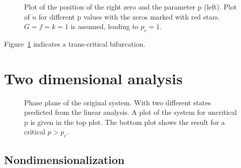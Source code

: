 \begin{figure}

\caption{Plot of the position of the right zero and the parameter p (left). Plot of $\dot{n}$ for different p values with the zeros marked with red stars. $G=f=k=1$ is assumed, leading to $p_c = 1$.}
\label{fig:transBif}
\end{figure}
Figure~\ref{fig:transBif} indicates a trans-critical bifurcation.

\section{Two dimensional analysis}
\begin{figure}


\caption{Phase plane of the original system. With two different states predicted from the linear analysis. A plot of the system for uncritical p is given in the top plot. The bottom plot shows the result for a critical $p > p_c$. }
\end{figure}
\subsection{Nondimensionalization}


